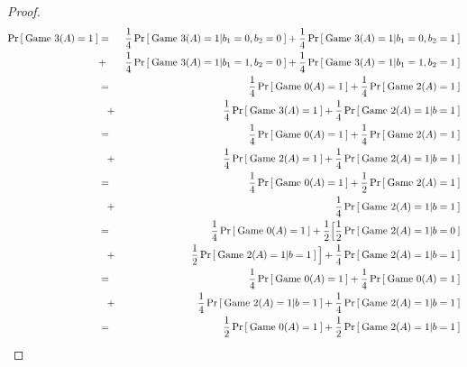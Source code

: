 \begin{proof}
\begin{eqnarray}
\nonumber \Pr\left[\: \text{Game 3}(A)=1 \:\right] &=&\frac{1}{4}\Pr\left[\: \text{Game 3}(A)=1|b_1=0, b_2=0 \:\right] + \frac{1}{4}\Pr\left[\: \text{Game 3}(A)=1|b_1=0, b_2=1 \:\right]\\
\nonumber & + & \frac{1}{4}\Pr\left[\: \text{Game 3}(A)=1|b_1=1, b_2=0 \:\right]+ \frac{1}{4}\Pr\left[\: \text{Game 3}(A)=1|b_1=1, b_2=1 \:\right]\\
\nonumber & = & \frac{1}{4}\Pr\left[\: \text{Game 0}(A)=1 \:\right] + \frac{1}{4}\Pr\left[\: \text{Game 2}(A)=1 \:\right]\\
\nonumber &\hspace*{2ex} + & \frac{1}{4}\Pr\left[\: \text{Game 3}(A)=1 \:\right] + \frac{1}{4}\Pr\left[\: \text{Game 2}(A)=1|b=1 \:\right]\\
\nonumber & = & \frac{1}{4}\Pr\left[\: \text{Game 0}(A)=1 \:\right] + \frac{1}{4}\Pr\left[\: \text{Game 2}(A)=1 \:\right]\\
\nonumber&\hspace*{2ex} + & \frac{1}{4}\Pr\left[\: \text{Game 2}(A)=1 \:\right] + \frac{1}{4}\Pr\left[\: \text{Game 2}(A)=1|b=1 \:\right]\\
\nonumber& = & \frac{1}{4}\Pr\left[\: \text{Game 0}(A)=1 \:\right] + \frac{1}{2}\Pr\left[\: \text{Game 2}(A)=1 \:\right]\\
\nonumber &\hspace*{2ex} + & \frac{1}{4}\Pr\left[\: \text{Game 2}(A)=1|b=1 \:\right]\\
\nonumber & = & \frac{1}{4}\Pr\left[\: \text{Game 0}(A)=1 \:\right] + \frac{1}{2}\Big[\frac{1}{2}\Pr\left[\: \text{Game 2}(A)=1|b=0 \:\right]\\
\nonumber	& \hspace*{2ex} + & \frac{1}{2}\Pr\left[\: \text{Game 2}(A)=1|b=1 \:\right]\Big] + \frac{1}{4}\Pr\left[\: \text{Game 2}(A)=1|b=1 \:\right]\\
\nonumber & = & \frac{1}{4}\Pr\left[\: \text{Game 0}(A)=1 \:\right] + \frac{1}{4}\Pr\left[\: \text{Game 0}(A)=1 \:\right]\\
\nonumber & \hspace*{2ex} + & \frac{1}{4}\Pr\left[\: \text{Game 2}(A)=1|b=1 \:\right] + \frac{1}{4}\Pr\left[\: \text{Game 2}(A)=1|b=1 \:\right]\\
& = & \frac{1}{2}\Pr\left[\: \text{Game 0}(A)=1 \:\right] + \frac{1}{2}\Pr\left[\: \text{Game 2}(A)=1|b=1 \:\right]
\end{eqnarray}
 

\end{proof}
